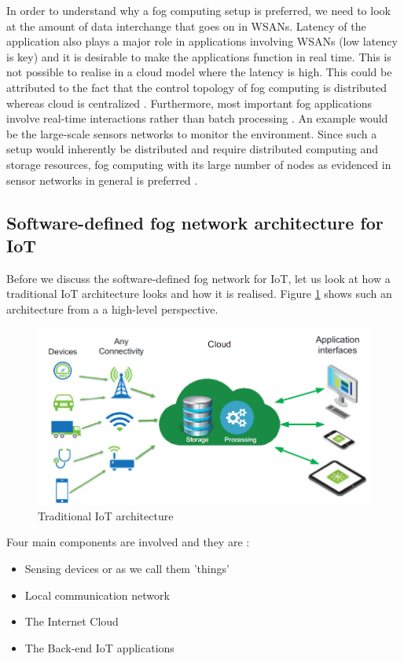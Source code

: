 \documentclass{article}
\begin{document}
In order to understand why a fog computing setup is preferred, we need to look at the amount of data interchange that goes on in WSANs.
Latency of the application also plays a major role in applications involving WSANs (low latency is key) and it is desirable to make the applications function in real time.
This is not possible to realise in a cloud model where the latency is high. This could be attributed to the fact that the control topology of fog computing is distributed whereas cloud is centralized \cite{lee2016gateway}.
Furthermore, most important fog applications involve real-time interactions rather than batch processing \cite{lee2016gateway}. 
An example would be the large-scale sensors networks to monitor the environment. Since such a setup would inherently be distributed and require distributed computing and storage resources, fog computing with its large number of nodes as evidenced in sensor networks in general is preferred \cite{lee2016gateway}. 


\subsection{Software-defined fog network architecture for IoT}

Before we discuss the software-defined fog network for IoT, let us look at how a traditional IoT architecture looks and how it is realised.
Figure \ref{fig:iot} shows such an architecture from a a high-level perspective.

\begin{figure}
\centering
\includegraphics[scale=0.5]{iot.png}
\caption{Traditional IoT architecture \cite{tomovic2017software}}
\label{fig:iot}
\end{figure} 

Four main components are involved and they are \cite{tomovic2017software}: 
\begin{itemize}
\item Sensing devices or as we call them 'things'
\item Local communication network
\item The Internet Cloud
\item The Back-end IoT applications
\end{itemize}
\end{document}
